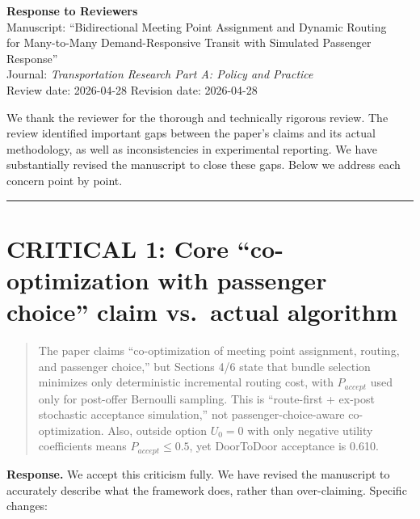 \documentclass[12pt]{article}
\newenvironment{revcomment}{%
  \begin{quote}\itshape
}{%
  \end{quote}
}
\begin{document}
\begin{center}
  {\Large\bfseries Response to Reviewers}\\[1ex]
  {\normalsize Manuscript: ``Bidirectional Meeting Point Assignment and Dynamic Routing\\
  for Many-to-Many Demand-Responsive Transit with Simulated Passenger Response''}\\[0.5ex]
  {\normalsize Journal: \textit{Transportation Research Part A: Policy and Practice}}\\[0.5ex]
  {\normalsize Review date: 2026-04-28 \quad Revision date: 2026-04-28}
\end{center}

\bigskip

We thank the reviewer for the thorough and technically rigorous review. The review identified important gaps between the paper's claims and its actual methodology, as well as inconsistencies in experimental reporting. We have substantially revised the manuscript to close these gaps. Below we address each concern point by point.

\bigskip\hrule\bigskip

\section*{CRITICAL 1: Core ``co-optimization with passenger choice'' claim vs.\ actual algorithm}

\begin{revcomment}
The paper claims ``co-optimization of meeting point assignment, routing, and passenger choice,'' but Sections 4/6 state that bundle selection minimizes only deterministic incremental routing cost, with $P_{accept}$ used only for post-offer Bernoulli sampling. This is ``route-first + ex-post stochastic acceptance simulation,'' not passenger-choice-aware co-optimization. Also, outside option $U_0=0$ with only negative utility coefficients means $P_{accept} \leq 0.5$, yet DoorToDoor acceptance is 0.610.
\end{revcomment}

\textbf{Response.} We accept this criticism fully. We have revised the manuscript to accurately describe what the framework does, rather than over-claiming. Specific changes:
\end{document}
